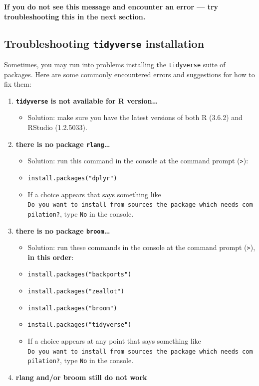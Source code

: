 \documentclass[
]{book}
\providecommand{\tightlist}{%
  \setlength{\itemsep}{0pt}\setlength{\parskip}{0pt}}
\begin{document}
\begin{enumerate}
  \textbf{If you do not see this message and encounter an error --- try troubleshooting this in the next section.}
\end{enumerate}

\hypertarget{troubleshooting-tidyverse-installation}{%
\subsection{\texorpdfstring{Troubleshooting \texttt{tidyverse} installation}{Troubleshooting tidyverse installation}}\label{troubleshooting-tidyverse-installation}}

Sometimes, you may run into problems installing the \texttt{tidyverse} suite of packages. Here are some commonly encountered errors and suggestions for how to fix them:

\begin{enumerate}
\def\labelenumi{\arabic{enumi}.}
\tightlist
\item
  \textbf{\texttt{tidyverse} is not available for R version\ldots{}}

  \begin{itemize}
  \tightlist
  \item
    Solution: make sure you have the latest versions of both R (3.6.2) and RStudio (1.2.5033).
  \end{itemize}
\item
  \textbf{there is no package \texttt{rlang}\ldots{}}

  \begin{itemize}
  \tightlist
  \item
    Solution: run this command in the console at the command prompt (\texttt{\textgreater{}}):
  \item
    \texttt{install.packages("dplyr")}
  \item
    If a choice appears that says something like \texttt{Do\ you\ want\ to\ install\ from\ sources\ the\ package\ which\ needs\ compilation?}, type \texttt{No} in the console.
  \end{itemize}
\item
  \textbf{there is no package \texttt{broom}\ldots{}}

  \begin{itemize}
  \tightlist
  \item
    Solution: run these commands in the console at the command prompt (\texttt{\textgreater{}}), \textbf{in this order}:
  \item
    \texttt{install.packages("backports")}
  \item
    \texttt{install.packages("zeallot")}
  \item
    \texttt{install.packages("broom")}
  \item
    \texttt{install.packages("tidyverse")}
  \item
    If a choice appears at any point that says something like \texttt{Do\ you\ want\ to\ install\ from\ sources\ the\ package\ which\ needs\ compilation?}, type \texttt{No} in the console.
  \end{itemize}
\item
  \textbf{rlang and/or broom still do not work}


\end{enumerate}
\end{document}
